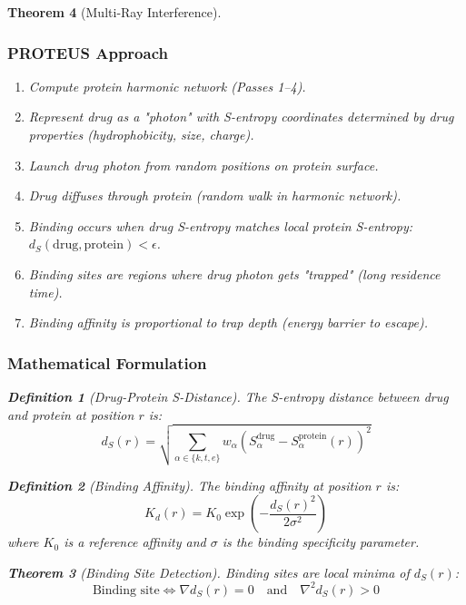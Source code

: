 \documentclass[11pt,a4paper]{article}
\newtheorem{theorem}{Theorem}[section]
\newtheorem{definition}[theorem]{Definition}
\begin{document}
\begin{theorem}[Multi-Ray Interference]
\subsubsection{PROTEUS Approach}

\begin{enumerate}
\item Compute protein harmonic network (Passes 1--4).
\item Represent drug as a "photon" with S-entropy coordinates determined by drug properties (hydrophobicity, size, charge).
\item Launch drug photon from random positions on protein surface.
\item Drug diffuses through protein (random walk in harmonic network).
\item Binding occurs when drug S-entropy matches local protein S-entropy: $d_S(\text{drug}, \text{protein}) < \epsilon$.
\item Binding sites are regions where drug photon gets "trapped" (long residence time).
\item Binding affinity is proportional to trap depth (energy barrier to escape).
\end{enumerate}

\subsubsection{Mathematical Formulation}

\begin{definition}[Drug-Protein S-Distance]
The S-entropy distance between drug and protein at position $r$ is:
\begin{equation}
d_S(r) = \sqrt{\sum_{\alpha \in \{k,t,e\}} w_\alpha (S_\alpha^{\text{drug}} - S_\alpha^{\text{protein}}(r))^2}
\end{equation}
\end{definition}

\begin{definition}[Binding Affinity]
The binding affinity at position $r$ is:
\begin{equation}
K_d(r) = K_0 \exp\left(-\frac{d_S(r)^2}{2\sigma^2}\right)
\end{equation}
where $K_0$ is a reference affinity and $\sigma$ is the binding specificity parameter.
\end{definition}

\begin{theorem}[Binding Site Detection]
Binding sites are local minima of $d_S(r)$:
\begin{equation}
\text{Binding site} \iff \nabla d_S(r) = 0 \quad \text{and} \quad \nabla^2 d_S(r) > 0
\end{equation}
\end{theorem}


\end{theorem}
\end{document}
